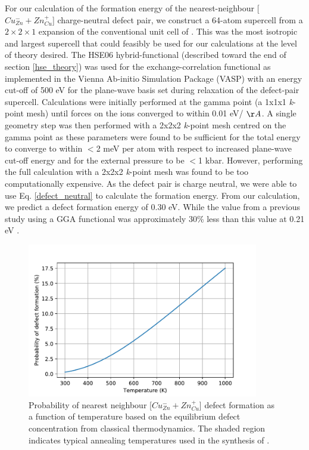 \documentclass[11pt, twoside]{report}
\begin{document}
For our calculation of the formation energy of the nearest-neighbour [$Cu_{Zn}^- + Zn_{Cu}^+$] charge-neutral defect pair, we construct a 64-atom supercell from a $2\times2\times1$ expansion of the conventional unit cell of {\CZTS}. This was the most isotropic and largest supercell that could feasibly be used for our calculations at the level of theory desired.
The HSE06 hybrid-functional \cite{HSE} (described toward the end of section \ref{hse_theory}) was used for the exchange-correlation functional as implemented in the Vienna Ab-initio Simulation Package (VASP) \cite{VASP} with an energy cut-off of 500 eV for the plane-wave basis set during relaxation of the defect-pair supercell. Calculations were initially performed at the gamma point (a 1x1x1 \textit{k}-point mesh) until forces on the ions converged to within 0.01 eV/ $\AA$. 
A single geometry step was then performed with a 2x2x2 \textit{k}-point mesh centred on the gamma point as these parameters were found to be sufficient for the total energy to converge to within $<$2 meV per atom with respect to increased plane-wave cut-off energy and for the external pressure to be $<$1 kbar. However, performing the full calculation with a 2x2x2 \textit{k}-point mesh was found to be too computationally expensive. 
As the defect pair is charge neutral, we were able to use Eq. \ref{defect_neutral} to calculate the formation energy. From our calculation, we predict a defect formation energy of 0.30 eV. While the value from a previous study using a GGA functional was approximately 30\% less than this value at 0.21 eV \cite{defects_Chen}.

\begin{figure}[h!]
  \centering
    \includegraphics[width=0.9\textwidth]{figures/CZTS_Cu-Zn_defect_conc.pdf}
    \caption{Probability of nearest neighbour [$Cu_{Zn}^- + Zn_{Cu}^+$] defect formation as a function of temperature based on the equilibrium defect concentration from classical thermodynamics. The shaded region indicates typical annealing temperatures used in the synthesis of {\CZTS}.}
  \label{Cu-Zn_eqm_conc}
\end{figure}
\end{document}
